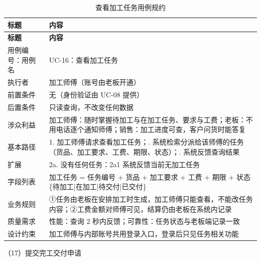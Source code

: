 \documentclass[12pt, a4paper]{ctexart}
\begin{document}
{\small
\begin{longtable}{@{}p{2.4cm} p{12.9cm}@{}}
\caption{查看加工任务用例规约}\label{tab:uc-16}\\
\toprule
\textbf{标题} & \textbf{内容} \\
\midrule
\endfirsthead
\toprule
\textbf{标题} & \textbf{内容} \\
\midrule
\endhead
用例编号：用例名 & UC-16：查看加工任务 \\
\midrule
执行者 & 加工师傅（账号由老板开通） \\
\midrule
前置条件 & 无（身份验证由 UC-08 提供） \\
\midrule
后置条件 & 只读查询，不改变任何数据 \\
\midrule
涉众利益 & 加工师傅：随时掌握待加工与在加工任务、要求与工费；\newline 老板：不用电话逐个通知师傅；\newline 销售：加工进度可查，客户问货时能答复 \\
\midrule
基本路径 & 1. 加工师傅请求查看加工任务；\newline 2. 系统检索分派给该师傅的任务（货品、加工要求、工费、期限、状态）；\newline 3. 系统反馈查询结果 \\
\midrule
扩展 & 2a. 没有任何任务：2a1 系统反馈当前无加工任务 \\
\midrule
字段列表 & 加工任务 = 任务编号 + 货品 + 加工要求 + 工费 + 期限 + 状态\{待加工|在加工|待交付|已交付\} \\
\midrule
业务规则 & ①任务由老板在安排加工时生成，加工师傅只能查看，不能改任务内容；\newline ②工费金额对师傅可见，结算仍由老板在系统内记录 \\
\midrule
质量需求 & 性能：查询 2 秒内反馈；\newline 可靠性：任务状态与老板端记录一致 \\
\midrule
设计约束 & 加工师傅与内部账号共用登录入口，登录后只见任务相关功能 \\
\midrule
\bottomrule
\end{longtable}}
\noindent（17）提交完工交付申请
\end{document}
